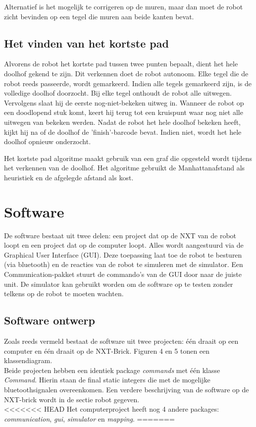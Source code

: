 \documentclass[tt3]{penoverslag}
\begin{document}
Alternatief is het mogelijk te corrigeren op de muren, maar dan moet de robot zicht bevinden op een tegel die muren aan beide kanten bevat.


\subsection{Het vinden van het kortste pad} %
\label{ssec:algoKortsteP}
Alvorens de robot het kortste pad tussen twee punten bepaalt, dient het hele doolhof gekend te zijn. Dit verkennen doet de robot autonoom. Elke tegel die de robot reeds passeerde, wordt gemarkeerd. Indien alle tegels gemarkeerd zijn, is de volledige doolhof doorzocht.
Bij elke tegel onthoudt de robot alle uitwegen. Vervolgens slaat hij de eerste nog-niet-bekeken uitweg in. Wanneer de robot op een doodlopend stuk komt, keert hij terug tot een kruispunt waar nog niet alle uitwegen van bekeken werden.
Nadat de robot het hele doolhof bekeken heeft, kijkt hij na of de doolhof de 'finish'-barcode bevat. Indien niet, wordt het hele doolhof opnieuw onderzocht.

Het kortste pad algoritme maakt gebruik van een graf die opgesteld wordt tijdens het verkennen van de doolhof. Het algoritme gebruikt de Manhattanafstand als heuristiek en de afgelegde afstand als kost.

\section{Software} %
\label{sec:softw}
De software bestaat uit twee delen: een project dat op de NXT van de robot loopt en een project dat op de computer loopt. Alles wordt aangestuurd via de Graphical User Interface (GUI). Deze toepassing laat toe de robot te besturen (via bluetooth) en de reacties van de robot te simuleren met de simulator. Een Communication-pakket stuurt de commando's van de GUI door naar de juiste unit.
De simulator kan gebruikt worden om de software op te testen zonder telkens op de robot te moeten wachten.

\subsection{Software ontwerp} %
\label{ssec:Sdesign}
Zoals reeds vermeld bestaat de software uit twee projecten: \'e\'en draait op een computer en \'e\'en draait op de NXT-Brick. Figuren 4 en 5 tonen een klassendiagram.\\
Beide projecten hebben een identiek package \textit{commands} met \'e\'en klasse \textit{Command}. Hierin staan de final static integers die met de mogelijke bluetoothsignalen overeenkomen. Een verdere beschrijving van de software op de NXT-brick wordt in de sectie robot gegeven.\\
<<<<<<< HEAD
Het computerproject heeft nog 4 andere packages: \textit{communication}, \textit{gui}, \textit{simulator} en \textit{mapping}. 
=======
\end{document}
